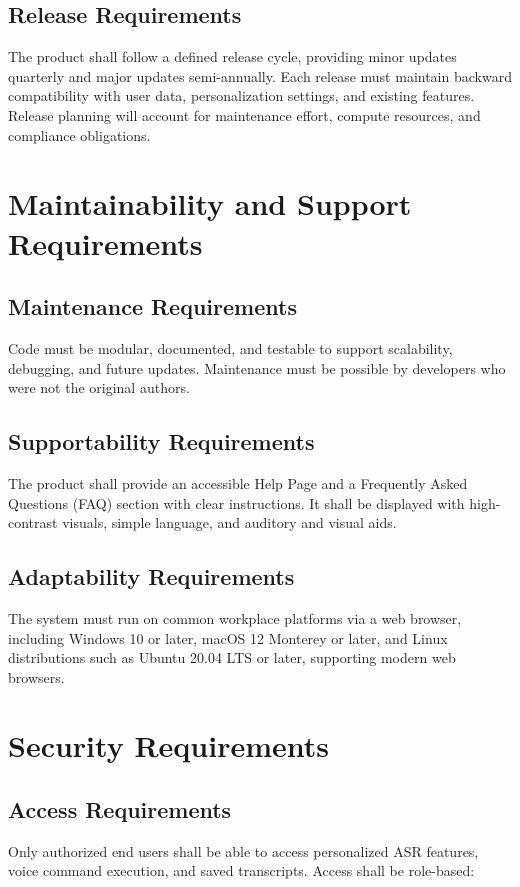 \documentclass[12pt]{article}
\begin{document}
\subsection{Release Requirements}
The product shall follow a defined release cycle, providing minor updates quarterly and major updates semi-annually. Each release must maintain backward compatibility with user data, personalization settings, and existing features. Release planning will account for maintenance effort, compute resources, and compliance obligations.

\section{Maintainability and Support Requirements}
\subsection{Maintenance Requirements}
Code must be modular, documented, and testable to support scalability, debugging, and future updates. Maintenance must be possible by developers who were not the original authors. 
\subsection{Supportability Requirements}
The product shall provide an accessible Help Page and a Frequently Asked Questions (FAQ) section with clear instructions. It shall be displayed with high-contrast visuals, simple language, and auditory and visual aids. 
\subsection{Adaptability Requirements}
The system must run on common workplace platforms via a web browser, including Windows 10 or later, macOS 12 Monterey or later, and Linux distributions such as Ubuntu 20.04 LTS or later, supporting modern web browsers.

\section{Security Requirements}
\subsection{Access Requirements}
Only authorized end users shall be able to access personalized ASR features, voice command execution, and saved transcripts. Access shall be role-based:
\end{document}
